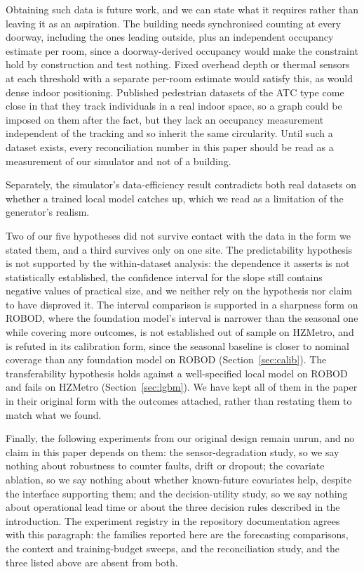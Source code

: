 \documentclass[utf8]{FrontiersinHarvard}
\newif\ifrevisionmarkup
\newcommand{\new}[1]{\ifrevisionmarkup\textcolor{revision}{#1}\else#1\fi}
\newif\ifsecondrevisionmarkup
\newcommand{\rev}[1]{\ifsecondrevisionmarkup\textcolor{revisiontwo}{#1}\else#1\fi}
\theoremstyle{plain}
\theoremstyle{definition}
\theoremstyle{remark}
\begin{document}
\new{Obtaining such data is future work, and we can state what it requires rather than leaving it as an aspiration. The building needs synchronised counting at every doorway, including the ones leading outside, plus an independent occupancy estimate per room, since a doorway-derived occupancy would make the constraint hold by construction and test nothing. Fixed overhead depth or thermal sensors at each threshold with a separate per-room estimate would satisfy this, as would dense indoor positioning. Published pedestrian datasets of the ATC type come close in that they track individuals in a real indoor space, so a graph could be imposed on them after the fact, but they lack an occupancy measurement independent of the tracking and so inherit the same circularity. Until such a dataset exists, every reconciliation number in this paper should be read as a measurement of our simulator and not of a building.}

Separately, the simulator's data-efficiency result contradicts both real datasets on whether a trained local model catches up, which we read as a limitation of the generator's realism.

Two of our five hypotheses did not survive contact with the data in the form we stated them\new{, and a third survives only on one site}. The predictability hypothesis is \rev{not supported by the within-dataset analysis: the dependence it asserts is not statistically established, the confidence interval for the slope still contains negative values of practical size, and we neither rely on the hypothesis nor claim to have disproved it}. The interval comparison is supported \new{in \rev{a sharpness form on ROBOD, where the foundation model's interval is narrower than the seasonal one while covering more outcomes, is not established out of sample on HZMetro,} and \rev{is} refuted in its calibration form, since the seasonal baseline is closer to nominal coverage than any foundation model on ROBOD (Section~\ref{sec:calib}). The transferability hypothesis holds against a well-specified local model on ROBOD and fails on HZMetro (Section~\ref{sec:lgbm})}. We have kept \new{all of them} in the paper in their original form with the outcomes attached, rather than restating them to match what we found.

\new{Finally, the following experiments from our original design remain unrun, and no claim in this paper depends on them: the sensor-degradation study, so we say nothing about robustness to counter faults, drift or dropout; the covariate ablation, so we say nothing about whether known-future covariates help, despite the interface supporting them; and the decision-utility study, so we say nothing about operational lead time or about the three decision rules described in the introduction. \rev{The experiment registry in the repository documentation agrees with this paragraph:} the families reported here are the forecasting comparisons, the context and training-budget sweeps, and the reconciliation study, and the three listed above are absent from both.}
\end{document}
